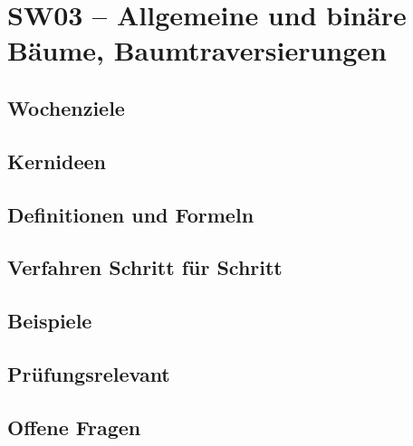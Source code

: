 \chapter{SW03 – Allgemeine und binäre Bäume, Baumtraversierungen}
\label{kap:sw03}

\section*{Wochenziele}
\begin{wochenziele}
\end{wochenziele}

\section{Kernideen}

\section{Definitionen und Formeln}

\section{Verfahren Schritt für Schritt}

\section{Beispiele}

\section{Prüfungsrelevant}

\section{Offene Fragen}
